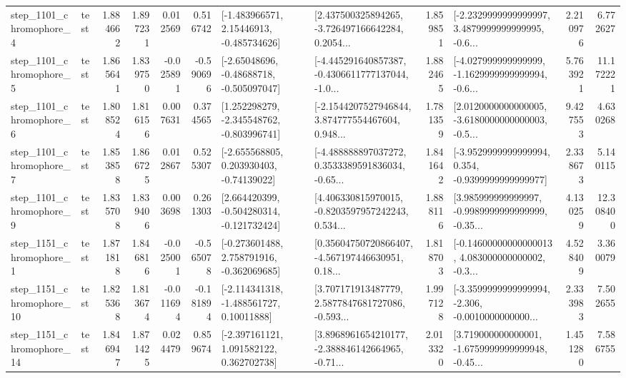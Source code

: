 \begin{tabular}{llrrrrllrlrr}
  step\_1101\_chromophore\_4 &      test &      1.884662 &    1.897231 &      0.012569 &  0.516742 &    [-1.483966571, 2.15446913, -0.485734626] &  [2.437500325894265, -3.726497166642284, 0.2054... &       1.859851 &  [-2.2329999999999997, 3.4879999999999995, -0.6... &            2.210976 &          6.772627 \\
  step\_1101\_chromophore\_5 &      test &      1.865641 &    1.839750 &     -0.025891 & -0.590696 &    [-2.65048696, -0.48688718, -0.505097047] &  [-4.445291640857387, -0.4306611777137044, -1.0... &       1.882465 &  [-4.027999999999999, -1.1629999999999994, -0.6... &            5.763921 &         11.172221 \\
  step\_1101\_chromophore\_6 &      test &      1.808524 &    1.816156 &      0.007631 &  0.374565 &   [1.252298279, -2.345548762, -0.803996741] &  [-2.1544207527946844, 3.874777554467604, 0.948... &       1.781359 &  [2.0120000000000005, -3.6180000000000003, -0.5... &            9.427553 &          4.630268 \\
  step\_1101\_chromophore\_7 &      test &      1.853858 &    1.866725 &      0.012867 &  0.525307 &    [-2.655568805, 0.203930403, -0.74139022] &  [-4.488888897037272, 0.3533389591836034, -0.65... &       1.841642 &  [-3.9529999999999994, 0.354, -0.9399999999999977] &            2.338673 &          5.140115 \\
  step\_1101\_chromophore\_9 &      test &      1.835708 &    1.839406 &      0.003698 &  0.261303 &   [2.664420399, -0.504280314, -0.121732424] &  [4.406330815970015, -0.8203597957242243, 0.534... &       1.888116 &  [3.985999999999997, -0.9989999999999999, -0.35... &            4.130259 &         12.308400 \\
  step\_1151\_chromophore\_1 &      test &      1.871818 &    1.846816 &     -0.025001 & -0.565078 &   [-0.273601488, 2.758791916, -0.362069685] &  [0.35604750720866407, -4.567197446630951, 0.18... &       1.818703 &  [-0.14600000000000013, 4.083000000000002, -0.3... &            4.528409 &          3.360079 \\
 step\_1151\_chromophore\_10 &      test &      1.825368 &    1.813674 &     -0.011694 & -0.181894 &    [-2.114341318, -1.488561727, 0.10011888] &  [3.707171913487779, 2.5877847681727086, -0.593... &       1.997128 &  [-3.3599999999999994, -2.306, -0.0010000000000... &            2.333983 &          7.502655 \\
 step\_1151\_chromophore\_14 &      test &      1.846947 &    1.871425 &      0.024479 &  0.859674 &    [-2.397161121, 1.091582122, 0.362702738] &  [3.8968961654210177, -2.388846142664965, -0.71... &       2.013320 &  [3.719000000000001, -1.6759999999999948, -0.45... &            1.451280 &          7.586755 \\

\end{tabular}
